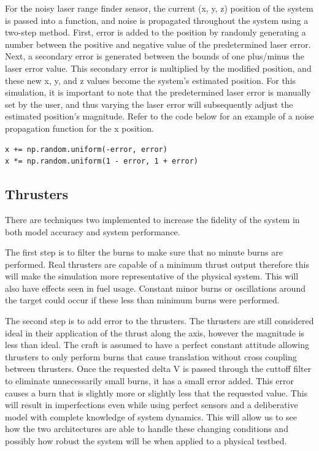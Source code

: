 \documentclass[journal, 10pt]{IEEEtran}
\begin{document}
For the noisy laser range finder sensor, the current (x, y, z) position of the system is passed into a function, and noise is propagated throughout the system using a two-step method. First, error is added to the position by randomly generating a number between the positive and negative value of the predetermined laser error. Next, a secondary error is generated between the bounds of one plus/minus the laser error value. This secondary error is multiplied by the modified position, and these new x, y, and z values become the system's estimated position.  For this simulation, it is important to note that the predetermined laser error is manually set by the user, and thus varying the laser error will subsequently adjust the estimated position's magnitude. Refer to the code below for an example of a noise propagation function for the x position.

\begin{verbatim}
x += np.random.uniform(-error, error)
x *= np.random.uniform(1 - error, 1 + error)
\end{verbatim}

\subsection{Thrusters}
There are techniques two implemented to increase the fidelity of the system in both model accuracy and system performance.

The first step is to filter the burns to make sure that no minute burns are performed.  Real thrusters are capable of a minimum thrust output therefore this will make the simulation more representative of the physical system.  This will also have effects seen in fuel usage.  Constant minor burns or oscillations around the target could occur if these less than minimum burns were performed.

The second step is to add error to the thrusters.  The thrusters are still considered ideal in their application of the thrust along the axis, however the magnitude is less than ideal.  The craft is assumed to have a perfect constant attitude allowing thrusters to only perform burns that cause translation without cross coupling between thrusters.  Once the requested delta V is passed through the cuttoff filter to eliminate unnecessarily small burns, it has a small error added.  This error causes a burn that is slightly more or slightly less that the requested value.  This will result in imperfections even while using perfect sensors and a deliberative model with complete knowledge of system dynamics.  This will allow us to see how the two architectures are able to handle these changing conditions and possibly how robust the system will be when applied to a physical testbed.
\end{document}
